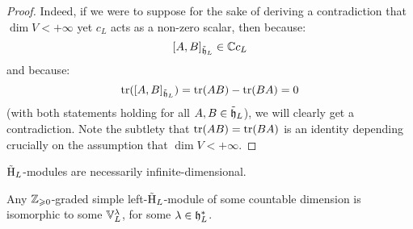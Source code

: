             \begin{proof}
                Indeed, if we were to suppose for the sake of deriving a contradiction that $\dim V < +\infty$ yet $c_L$ acts as a non-zero scalar, then because:
                    $$[A, B]_{\tilde{\mathfrak{h}}_L} \in \mathbb{C} c_L$$
                and because:
                    $$\operatorname{tr}([A, B]_{\tilde{\mathfrak{h}}_L}) = \operatorname{tr}(AB) - \operatorname{tr}(BA) = 0$$
                (with both statements holding for all $A, B \in \tilde{\mathfrak{h}}_L$), we will clearly get a contradiction. Note the subtlety that $\operatorname{tr}(AB) = \operatorname{tr}(BA)$ is an identity depending crucially on the assumption that $\dim V < +\infty$.
            \end{proof}
        \begin{corollary}
            $\tilde{\mathrm{H}}_L$-modules are necessarily infinite-dimensional. 
        \end{corollary}
        \begin{proposition} \label{prop: simple_lattice_weyl_modules_are_vacuum_modules}
            Any $\mathbb{Z}_{\geqslant 0}$-graded simple left-$\tilde{\mathrm{H}}_L$-module of some countable dimension is isomorphic to some $\mathbb{V}_L^{\lambda}$, for some $\lambda \in \mathfrak{h}_L^*$.
        \end{proposition}
